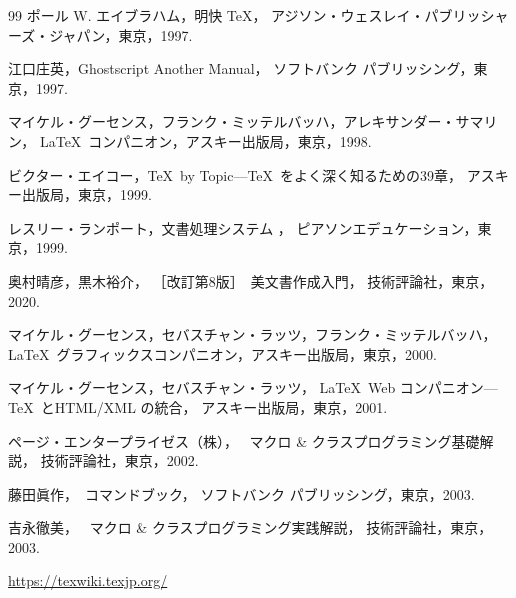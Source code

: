 \documentclass[technicalreport]{ieicej}
\begin{document}
\begin{thebibliography}{99}
ポール W. エイブラハム，明快 \TeX{}，
アジソン・ウェスレイ・パブリッシャーズ・ジャパン，東京，1997. 

江口庄英，Ghostscript Another Manual，
ソフトバンク パブリッシング，東京，1997. 

マイケル・グーセンス，フランク・ミッテルバッハ，アレキサンダー・サマリン，
\LaTeX\ コンパニオン，アスキー出版局，東京，1998. 

ビクター・エイコー，\TeX\ by Topic---\TeX\ をよく深く知るための39章，
アスキー出版局，東京，1999. 

レスリー・ランポート，文書処理システム \LaTeXe{}，
ピアソンエデュケーション，東京，1999. 

奥村晴彦，黒木裕介，
［改訂第8版］\LaTeXe\ 美文書作成入門，
技術評論社，東京，2020.

マイケル・グーセンス，セバスチャン・ラッツ，フランク・ミッテルバッハ，
\LaTeX\ グラフィックスコンパニオン，アスキー出版局，東京，2000. 

マイケル・グーセンス，セバスチャン・ラッツ，
\LaTeX\ Web コンパニオン---\TeX\ とHTML/XML の統合，
アスキー出版局，東京，2001. 

ページ・エンタープライゼス\<（株）\<，
\LaTeXe\ マクロ \& クラスプログラミング基礎解説，
技術評論社，東京，2002. 

藤田眞作，\LaTeXe\ コマンドブック，
ソフトバンク パブリッシング，東京，2003. 

吉永徹美，
\LaTeXe\ マクロ \& クラスプログラミング実践解説，
技術評論社，東京，2003. 

\url{https://texwiki.texjp.org/}
\end{thebibliography}
\end{document}
